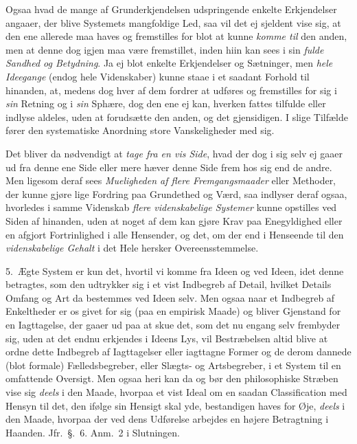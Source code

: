 \documentclass[12pt,a4paper]{book}
\newcommand{\apage}[1]{\marginnote{\footnotesize\textit{[#1]}}}
\begin{document}
Ogsaa hvad de mange af Grunderkjendelsen udspringende enkelte Erkjendelser
angaaer, der blive Systemets mangfoldige Led, saa vil det ej sjeldent vise sig, at
den ene allerede maa haves og fremstilles for blot at kunne \emph{komme til} den
anden, men at denne dog igjen maa være fremstillet, inden hiin kan sees i
sin \emph{fulde Sandhed og Betydning}. Ja ej blot enkelte Erkjendelser og
Sætninger, men \emph{hele Ideegange} (endog hele Videnskaber) kunne staae i et
saadant Forhold til hinanden, at, medens dog hver af dem fordrer at udføres og
fremstilles for sig i \emph{sin} Retning og i \emph{sin} Sphære, dog den ene ej kan, hverken
fattes tilfulde eller indlyse aldeles, uden at forudsætte den anden, og det
gjensidigen. I slige Tilfælde fører den systematiske Anordning store
Vanskeligheder med sig.

Det bliver da nødvendigt at \emph{tage fra en vis Side}, hvad der dog i sig selv ej
gaaer ud fra denne ene Side eller mere hæver denne Side frem hos sig end de andre.
Men ligesom deraf sees \emph{Mueligheden af flere Fremgangsmaader} eller Methoder,
der kunne gjøre lige \apage{144} Fordring paa Grundethed og Værd, saa indlyser deraf ogsaa,
hvorledes i samme Videnskab \emph{flere videnskabelige Systemer} kunne opstilles
ved Siden af hinanden, uden at noget af dem kan gjøre Krav paa Enegyldighed eller
en afgjort Fortrinlighed i alle Hensender, og det, om der end i Henseende til den
\emph{videnskabelige Gehalt} i det Hele hersker Overeensstemmelse.

5.~Ægte System er kun det, hvortil vi komme fra Ideen og ved Ideen, idet denne
betragtes, som den udtrykker sig i et vist Indbegreb af Detail, hvilket Details
Omfang og Art da bestemmes ved Ideen selv. Men ogsaa naar et Indbegreb af
Enkeltheder er os givet for sig (paa en empirisk Maade) og bliver Gjenstand for en
Iagttagelse, der gaaer ud paa at skue det, som det nu engang selv frembyder sig,
uden at det endnu erkjendes i Ideens Lys, vil Bestræbelsen altid blive at ordne
dette Indbegreb af Iagttagelser eller iagttagne Former og de derom dannede (blot
formale) Fælledsbegreber, eller Slægts- og Artsbegreber, i et System til en
omfattende Oversigt. Men ogsaa heri kan da og bør den philosophiske Stræben vise
sig \emph{deels} i den Maade, hvorpaa et vist Ideal om en saadan Classification med
Hensyn til det, den ifølge sin Hensigt skal yde, bestandigen haves for Øje,
\emph{deels} i den Maade, hvorpaa der ved dens Udførelse arbejdes en højere
\apage{145} Betragtning i Haanden. Jfr.\ §.~6. Anm.~2 i Slutningen.
\end{document}
